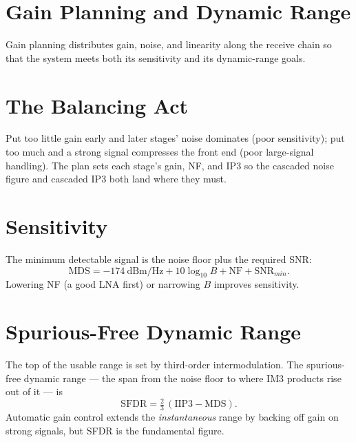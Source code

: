 \section{Gain Planning and Dynamic Range}\label{sec:tb_gainplan}



Gain planning distributes gain, noise, and linearity along the receive chain so
that the system meets both its sensitivity and its dynamic-range goals.

\section{The Balancing Act}
Put too little gain early and later stages' noise dominates (poor sensitivity);
put too much and a strong signal compresses the front end (poor large-signal
handling). The plan sets each stage's gain, NF, and IP3 so the cascaded noise
figure and cascaded IP3 both land where they must.

\section{Sensitivity}
The minimum detectable signal is the noise floor plus the required SNR:
\[ \text{MDS} = -174\ \text{dBm/Hz} + 10\log_{10}B + \text{NF} + \text{SNR}_{min}. \]
Lowering NF (a good LNA first) or narrowing $B$ improves sensitivity.

\section{Spurious-Free Dynamic Range}
The top of the usable range is set by third-order intermodulation. The
spurious-free dynamic range --- the span from the noise floor to where IM3
products rise out of it --- is
\[ \text{SFDR} = \tfrac{2}{3}\,(\text{IIP3} - \text{MDS}). \]
Automatic gain control extends the \emph{instantaneous} range by backing off gain
on strong signals, but SFDR is the fundamental figure.



